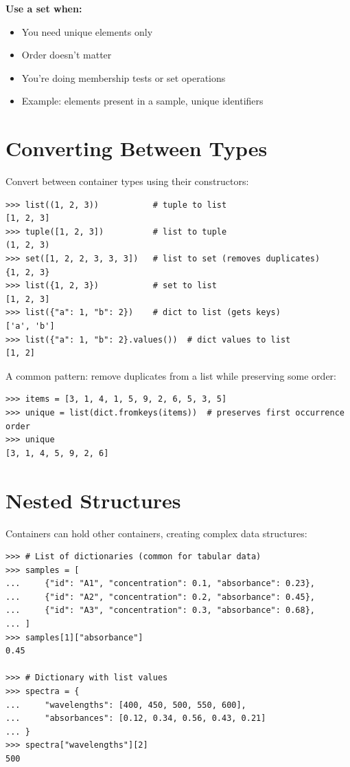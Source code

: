 \textbf{Use a set when:}
\begin{itemize}
    \item You need unique elements only
    \item Order doesn't matter
    \item You're doing membership tests or set operations
    \item Example: elements present in a sample, unique identifiers
\end{itemize}

\section{Converting Between Types}
\label{sec:container-conversion}

Convert between container types using their constructors:

\begin{lstlisting}
>>> list((1, 2, 3))           # tuple to list
[1, 2, 3]
>>> tuple([1, 2, 3])          # list to tuple
(1, 2, 3)
>>> set([1, 2, 2, 3, 3, 3])   # list to set (removes duplicates)
{1, 2, 3}
>>> list({1, 2, 3})           # set to list
[1, 2, 3]
>>> list({"a": 1, "b": 2})    # dict to list (gets keys)
['a', 'b']
>>> list({"a": 1, "b": 2}.values())  # dict values to list
[1, 2]
\end{lstlisting}

A common pattern: remove duplicates from a list while preserving some order:

\begin{lstlisting}
>>> items = [3, 1, 4, 1, 5, 9, 2, 6, 5, 3, 5]
>>> unique = list(dict.fromkeys(items))  # preserves first occurrence order
>>> unique
[3, 1, 4, 5, 9, 2, 6]
\end{lstlisting}

\section{Nested Structures}
\label{sec:nested}

Containers can hold other containers, creating complex data structures:

\begin{lstlisting}
>>> # List of dictionaries (common for tabular data)
>>> samples = [
...     {"id": "A1", "concentration": 0.1, "absorbance": 0.23},
...     {"id": "A2", "concentration": 0.2, "absorbance": 0.45},
...     {"id": "A3", "concentration": 0.3, "absorbance": 0.68},
... ]
>>> samples[1]["absorbance"]
0.45

>>> # Dictionary with list values
>>> spectra = {
...     "wavelengths": [400, 450, 500, 550, 600],
...     "absorbances": [0.12, 0.34, 0.56, 0.43, 0.21]
... }
>>> spectra["wavelengths"][2]
500
\end{lstlisting}

